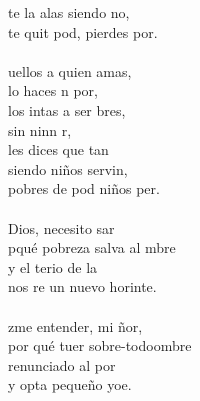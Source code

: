 \begin{cancion}
	te la alas siendo no, \\
	te quit pod, pierdes  por.\\
	\jump\\
	uellos a quien amas,\\
	lo haces n por,\\
	los intas a ser bres, \\
	sin ninn r,\\
	les dices que tan \\
	siendo niños servin, \\
	pobres de pod niños  per.\\
	\jump\\
	 Dios, necesito sar\\
	pqué  pobreza salva al mbre\\
	y el terio de la \\
	nos re un nuevo horinte.   \\
	\jump\\
	zme entender, mi ñor,\\
	por qué tuer sobre-todoombre\\
	 renunciado al por\\
	y opta  pequeño yoe.\\
\end{cancion}%

